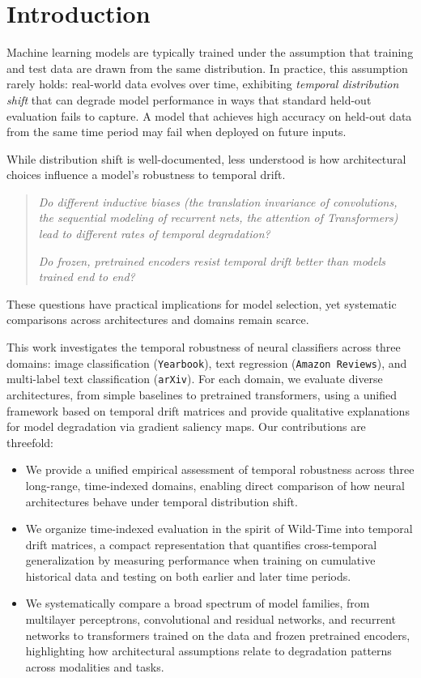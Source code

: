 \tightvspace{-0.55cm}
\section{Introduction}
\label{section_introduction}

Machine learning models are typically trained under the assumption that training and test data are drawn from the same distribution. In practice, this assumption rarely holds: real-world data evolves over time, exhibiting \textit{temporal distribution shift} that can degrade model performance in ways that standard held-out evaluation fails to capture. A model that achieves high accuracy on held-out data from the same time period may fail when deployed on future inputs.

While distribution shift is well-documented, less understood is how architectural choices influence a model's robustness to temporal drift. \begin{quote}
\emph{Do different inductive biases (the translation invariance of convolutions, the sequential modeling of recurrent nets, the attention of Transformers) lead to different rates of temporal degradation?}

\emph{Do frozen, pretrained encoders resist temporal drift better than models trained end to end?}
\end{quote} These questions have practical implications for model selection, yet systematic comparisons across architectures and domains remain scarce.


This work investigates the temporal robustness of neural classifiers across three domains: image classification (\texttt{Yearbook}), text regression (\texttt{Amazon Reviews}), and multi-label text classification (\texttt{arXiv}). For each domain, we evaluate diverse architectures, from simple baselines to pretrained transformers, using a unified framework based on temporal drift matrices and provide qualitative explanations for model degradation via gradient saliency maps. Our contributions are threefold:

\tightvspace{-7pt}
\begin{itemize}
    \item We provide a unified empirical assessment of temporal robustness across three long-range, time-indexed domains, enabling direct comparison of how neural architectures behave under temporal distribution shift.
    \item We organize time-indexed evaluation in the spirit of Wild-Time \cite{yao2022wildtime} into temporal drift matrices, a compact representation that quantifies cross-temporal generalization by measuring performance when training on cumulative historical data and testing on both earlier and later time periods.
    \item We systematically compare a broad spectrum of model families, from multilayer perceptrons, convolutional and residual networks, and recurrent networks to transformers trained on the data and frozen pretrained encoders, highlighting how architectural assumptions relate to degradation patterns across modalities and tasks.
\end{itemize}
\tightvspace{-7pt}

